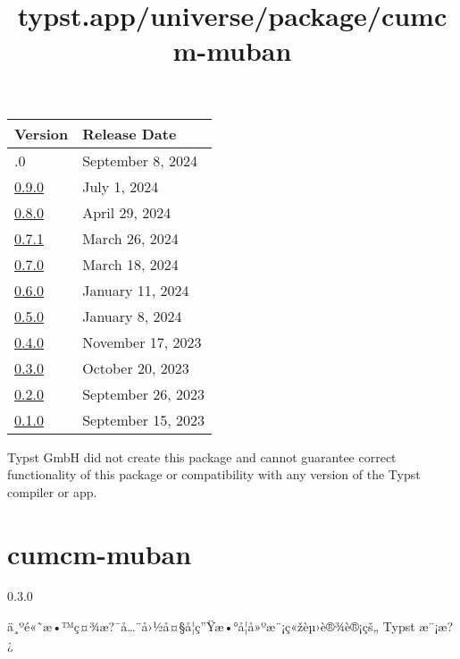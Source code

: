 \begin{longtable}[]{@{}ll@{}}
\toprule\noalign{}
Version & Release Date \\
\midrule\noalign{}
\endhead
\bottomrule\noalign{}
\endlastfoot
1.0.0 & September 8, 2024 \\
\href{https://typst.app/universe/package/gentle-clues/0.9.0/}{0.9.0} &
July 1, 2024 \\
\href{https://typst.app/universe/package/gentle-clues/0.8.0/}{0.8.0} &
April 29, 2024 \\
\href{https://typst.app/universe/package/gentle-clues/0.7.1/}{0.7.1} &
March 26, 2024 \\
\href{https://typst.app/universe/package/gentle-clues/0.7.0/}{0.7.0} &
March 18, 2024 \\
\href{https://typst.app/universe/package/gentle-clues/0.6.0/}{0.6.0} &
January 11, 2024 \\
\href{https://typst.app/universe/package/gentle-clues/0.5.0/}{0.5.0} &
January 8, 2024 \\
\href{https://typst.app/universe/package/gentle-clues/0.4.0/}{0.4.0} &
November 17, 2023 \\
\href{https://typst.app/universe/package/gentle-clues/0.3.0/}{0.3.0} &
October 20, 2023 \\
\href{https://typst.app/universe/package/gentle-clues/0.2.0/}{0.2.0} &
September 26, 2023 \\
\href{https://typst.app/universe/package/gentle-clues/0.1.0/}{0.1.0} &
September 15, 2023 \\
\end{longtable}

Typst GmbH did not create this package and cannot guarantee correct
functionality of this package or compatibility with any version of the
Typst compiler or app.


\title{typst.app/universe/package/cumcm-muban}

\label{banner}
\label{template-thumbnail}

\section{cumcm-muban}\label{cumcm-muban}

{ 0.3.0 }

ä¸ºé«˜æ•™ç¤¾æ?¯å\ldots¨å›½å¤§å­¦ç''Ÿæ•°å­¦å»ºæ¨¡ç«žèµ›è®¾è®¡çš„ Typst
æ¨¡æ?¿

